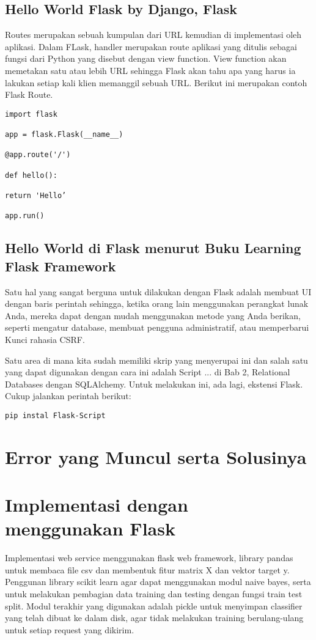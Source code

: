 \documentclass[12pt]{article}
\begin{document}
\subsection{Hello World Flask by Django, Flask}
Routes merupakan sebuah kumpulan dari URL kemudian di implementasi oleh aplikasi. Dalam FLask, handler merupakan route aplikasi yang ditulis sebagai fungsi dari Python yang disebut dengan view function. View function akan memetakan satu atau lebih URL sehingga Flask akan tahu apa yang harus ia lakukan setiap kali klien memanggil sebuah URL. Berikut ini merupakan contoh Flask Route\cite{djangoweb}.
\begin{verbatim}
import flask

app = flask.Flask(__name__)

@app.route('/')

def hello():

return 'Hello’

app.run()

\end{verbatim}

\subsection{Hello World di Flask menurut Buku Learning Flask Framework}
Satu hal yang sangat berguna untuk dilakukan dengan Flask adalah membuat UI dengan baris perintah sehingga, ketika orang lain menggunakan perangkat lunak Anda, mereka dapat dengan mudah menggunakan metode yang Anda berikan, seperti mengatur database, membuat pengguna administratif, atau memperbarui Kunci rahasia CSRF.

Satu area di mana kita sudah memiliki skrip yang menyerupai ini dan salah satu yang dapat digunakan dengan cara ini adalah Script ... di Bab 2, Relational Databases dengan SQLAlchemy. Untuk melakukan ini, ada lagi, ekstensi Flask. Cukup jalankan perintah berikut:

\begin{verbatim}
pip instal Flask-Script
\end{verbatim}



\section{Error yang Muncul serta Solusinya}



\section{Implementasi dengan menggunakan Flask}
Implementasi web service menggunakan flask web framework, library pandas untuk membaca file csv dan membentuk fitur matrix X dan vektor target y. Penggunan library scikit learn agar dapat menggunakan modul naive bayes, serta untuk melakukan pembagian data training dan testing dengan fungsi train test split. Modul terakhir yang digunakan adalah pickle untuk menyimpan classifier yang telah dibuat ke dalam disk, agar tidak melakukan training berulang-ulang untuk setiap request yang dikirim.
\end{document}
